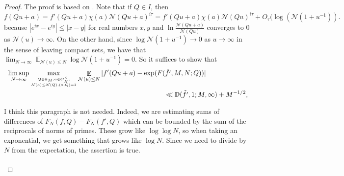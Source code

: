 \documentclass[11pt]{amsart}
\theoremstyle{definition}
\DeclareMathOperator*{\E}{\mathbb{E}}
\newcommand{\D}{{\mathbb D}}
\newcommand{\NN}{{\mathcal N}}
\newcommand{\U}{{\mathbb U}}
\newcommand{\mf}{\mathfrak}
\newcommand{\WS}[1]{{\color{blue}{{#1}}}}
\begin{document}
\begin{proof} The proof is based on \cite[Lemma~2.5]{KMPT}. %
%
%
Note that if $Q \in I$, then
    $$f(Qu+a)=f'(Qu+a)\chi(a)\NN(Qu+a)^{i\tau}=f'(Qu+a)\chi(a)\NN(Qu)^{i\tau}+O_{\tau}(\log (\NN(1+u^{-1})).$$
    because $|e^{ix}-e^{iy}| \leq |x-y|$ for real numbers $x, y$ and $\ln \frac{\NN(Qu+a)}{\NN(Qu)}$ converges to 0 as $\NN(u) \to \infty$. 
    On the other hand, since  $\log \NN(1+u^{-1}) \to 0$ as $u \to \infty$ in the sense of leaving compact sets, we have that 
    $\lim_{N\to\infty}\E_{\NN(u) \leq N}\log \NN(1+u^{-1})=0$.
  So it suffices to show that 
\begin{equation}
    \begin{split}
       & \limsup_{N\to\infty}\max_{Q\in \Phi_{M}, a\in\mathcal{O}_K^{\times},\atop \NN(a)\leq \NN(Q), (a,Q)=1}\E_{ \NN(u)\leq N}\vert f'(Qu+a)-\exp(F(\tilde{f'},M,N;Q))\vert
     \\&\quad\quad\quad\quad\quad\quad\quad\quad\quad\quad\quad\quad\quad\quad\quad\quad\quad\quad\quad\quad\quad\quad\quad\ll \D(\tilde{f'},1;M,\infty)+M^{-1/2},
    \end{split}
\end{equation}

\iffalse
{\color{red} I think this paragraph is not needed.}
Indeed, we are estimating sums of differences of $F_N(f,Q)-F_N(f',Q)$ which can be bounded by the sum of the reciprocals of norms of primes. These grow like $\log \log N$, so when taking an exponential, we get something that grows like $\log N$. Since we need to divide by $N$ from the expectation, the assertion is true.
\\ \\


\end{proof}
\end{document}
